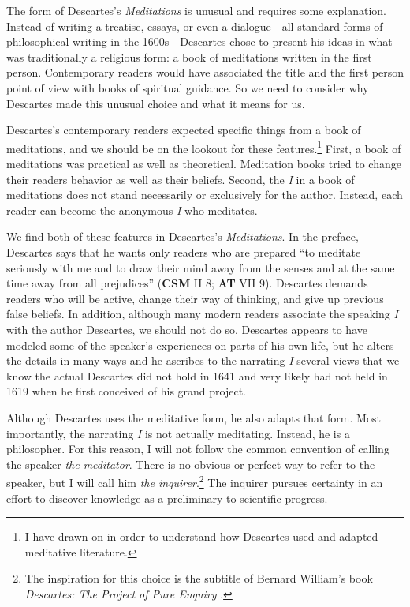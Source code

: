 The form of Descartes's \textit{Meditations} is unusual and requires some explanation. Instead of writing a treatise, essays, or even a dialogue---all standard forms of philosophical writing in the 1600s---Descartes chose to present his ideas in what was traditionally a religious form: a book of meditations written in the first person. Contemporary readers would have associated the title and the first person point of view with books of spiritual guidance. So we need to consider why Descartes made this unusual choice and what it means for us.

Descartes's contemporary readers expected specific things from a book of meditations, and we should be on the lookout for these features.\footnote{I have drawn on \textcites{rorty1986a}{williams1986}{mercer2014} in order to understand how Descartes used and adapted meditative literature.} First, a book of meditations was practical as well as theoretical. Meditation books tried to change their readers behavior as well as their beliefs. Second, the \textit{I} in a book of meditations does not stand necessarily or exclusively for the author. Instead, each reader can become the anonymous \textit{I} who meditates.

We find both of these features in Descartes's \textit{Meditations}. In the preface, Descartes says that he wants only readers who are prepared ``to meditate seriously with me and to draw their mind away from the senses and at the same time away from all prejudices'' (\textbf{CSM} II 8; \textbf{AT} VII 9). Descartes demands readers who will be active, change their way of thinking, and give up previous false beliefs. In addition, although many modern readers associate the speaking \textit{I} with the author Descartes, we should not do so. Descartes appears to have modeled some of the speaker's experiences on parts of his own life, but he alters the details in many ways and he ascribes to the narrating \textit{I} several views that we know the actual Descartes did not hold in 1641 and very likely had not held in 1619 when he first conceived of his grand project.

Although Descartes uses the meditative form, he also adapts that form. Most importantly, the narrating \textit{I} is not actually meditating. Instead, he is a philosopher. For this reason, I will not follow the common convention of calling the speaker \textit{the meditator}. There is no obvious or perfect way to refer to the speaker, but I will call him \textit{the inquirer}.\footnote{The inspiration for this choice is the subtitle of Bernard William's book \textit{Descartes: The Project of Pure Enquiry} \parencite{williams1978}.} The inquirer pursues certainty in an effort to discover knowledge as a preliminary to scientific progress.

